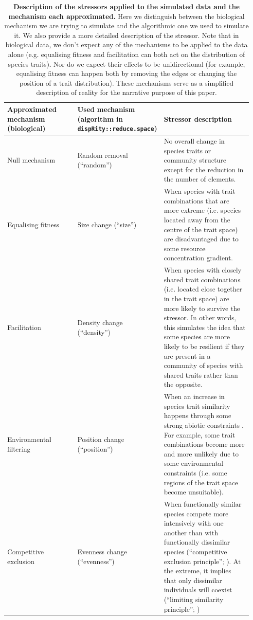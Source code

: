 \documentclass[12pt,letterpaper]{article}
\begin{document}
\begin{table}
\center
\scriptsize
\begin{tabular}{p{0.3\linewidth}|p{0.3\linewidth}|p{0.4\linewidth}}
\textbf{Approximated mechanism (biological)} & \textbf{Used mechanism (algorithm in \texttt{dispRity::reduce.space})} & \textbf{Stressor description}\\
\hline
  Null mechanism & Random removal (``random'') & No overall change in species traits or community structure except for the reduction in the number of elements.\\
  Equalising fitness & Size change (``size'') & When species with trait combinations that are more extreme (i.e. species located away from the centre of the trait space) are disadvantaged due to some resource concentration gradient. \\
  Facilitation & Density change (``density'') & When species with closely shared trait combinations (i.e. located close together in the trait space) are more likely to survive the stressor. In other words, this simulates the idea that some species are more likely to be resilient if they are present in a community of species with shared traits rather than the opposite.\\
  Environmental filtering & Position change (``position'') & When an increase in species trait similarity happens through some strong abiotic constraints \citep{cornwell2006trait}. For example, some trait combinations become more and more unlikely due to some environmental constraints (i.e. some regions of the trait space become unsuitable).\\
  Competitive exclusion & Evenness change (``evenness'') & When functionally similar species compete more intensively with one another than with functionally dissimilar species (``competitive exclusion principle''; \citealt{hardin1960competitive}). At the extreme, it implies that only dissimilar individuals will coexist (``limiting similarity principle''; \citealt{macarthur1967limiting})\\

    \end{tabular}
    \caption{\scriptsize{\textbf{Description of the stressors applied to the simulated data and the mechanism each approximated.} Here we distinguish between the biological mechanism we are trying to simulate and the algorithmic one we used to simulate it. We also provide a more detailed description of the stressor. Note that in biological data, we don't expect any of the mechanisms to be applied to the data alone (e.g. equalising fitness and facilitation can both act on the distribution of species traits). Nor do we expect their effects to be unidirectional (for example, equalising fitness can happen both by removing the edges or changing the position of a trait distribution). These mechanisms serve as a simplified description of reality for the narrative purpose of this paper.}
}
    \label{Tab:mechanisms}
\end{table}
\end{document}
